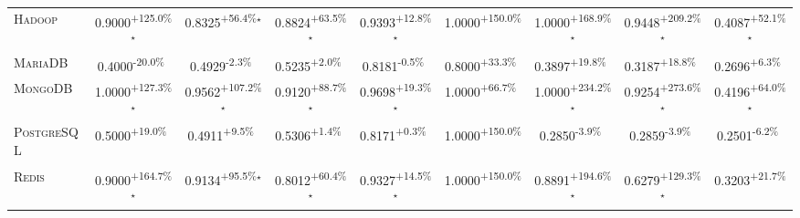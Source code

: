 \begin{table}[htbp]
\begin{tabular}{l|cccc|cccc}
\textsc{Hadoop} & \cellcolor{green!30}0.9000\textsuperscript{+125.0\%}$^\star$ & \cellcolor{green!30}0.8325\textsuperscript{+56.4\%}$^\star$ & \cellcolor{green!30}0.8824\textsuperscript{+63.5\%}$^\star$ & \cellcolor{green!30}0.9393\textsuperscript{+12.8\%}$^\star$ & \cellcolor{green!30}1.0000\textsuperscript{+150.0\%}$^{\,\,\,}$ & \cellcolor{green!30}1.0000\textsuperscript{+168.9\%}$^\star$ & \cellcolor{green!30}0.9448\textsuperscript{+209.2\%}$^\star$ & \cellcolor{green!30}0.4087\textsuperscript{+52.1\%}$^\star$ \\
\textsc{MariaDB} & \cellcolor{red!30}0.4000\textsuperscript{-20.0\%}$^{\,\,\,}$ & \cellcolor{red!30}0.4929\textsuperscript{-2.3\%}$^{\,\,\,}$ & \cellcolor{green!30}0.5235\textsuperscript{+2.0\%}$^{\,\,\,}$ & \cellcolor{red!30}0.8181\textsuperscript{-0.5\%}$^{\,\,\,}$ & \cellcolor{green!30}0.8000\textsuperscript{+33.3\%}$^{\,\,\,}$ & \cellcolor{green!30}0.3897\textsuperscript{+19.8\%}$^{\,\,\,}$ & \cellcolor{green!30}0.3187\textsuperscript{+18.8\%}$^{\,\,\,}$ & \cellcolor{green!30}0.2696\textsuperscript{+6.3\%}$^{\,\,\,}$ \\
\textsc{MongoDB} & \cellcolor{green!30}1.0000\textsuperscript{+127.3\%}$^\star$ & \cellcolor{green!30}0.9562\textsuperscript{+107.2\%}$^\star$ & \cellcolor{green!30}0.9120\textsuperscript{+88.7\%}$^\star$ & \cellcolor{green!30}0.9698\textsuperscript{+19.3\%}$^\star$ & \cellcolor{green!30}1.0000\textsuperscript{+66.7\%}$^{\,\,\,}$ & \cellcolor{green!30}1.0000\textsuperscript{+234.2\%}$^\star$ & \cellcolor{green!30}0.9254\textsuperscript{+273.6\%}$^\star$ & \cellcolor{green!30}0.4196\textsuperscript{+64.0\%}$^\star$ \\
\textsc{PostgreSQL} & \cellcolor{green!30}0.5000\textsuperscript{+19.0\%}$^{\,\,\,}$ & \cellcolor{green!30}0.4911\textsuperscript{+9.5\%}$^{\,\,\,}$ & \cellcolor{green!30}0.5306\textsuperscript{+1.4\%}$^{\,\,\,}$ & \cellcolor{green!30}0.8171\textsuperscript{+0.3\%}$^{\,\,\,}$ & \cellcolor{green!30}1.0000\textsuperscript{+150.0\%}$^{\,\,\,}$ & \cellcolor{red!30}0.2850\textsuperscript{-3.9\%}$^{\,\,\,}$ & \cellcolor{red!30}0.2859\textsuperscript{-3.9\%}$^{\,\,\,}$ & \cellcolor{red!30}0.2501\textsuperscript{-6.2\%}$^{\,\,\,}$ \\
\textsc{Redis} & \cellcolor{green!30}0.9000\textsuperscript{+164.7\%}$^\star$ & \cellcolor{green!30}0.9134\textsuperscript{+95.5\%}$^\star$ & \cellcolor{green!30}0.8012\textsuperscript{+60.4\%}$^\star$ & \cellcolor{green!30}0.9327\textsuperscript{+14.5\%}$^\star$ & \cellcolor{green!30}1.0000\textsuperscript{+150.0\%}$^{\,\,\,}$ & \cellcolor{green!30}0.8891\textsuperscript{+194.6\%}$^\star$ & \cellcolor{green!30}0.6279\textsuperscript{+129.3\%}$^\star$ & \cellcolor{green!30}0.3203\textsuperscript{+21.7\%}$^{\,\,\,}$ \\

\end{tabular}
\end{table}
